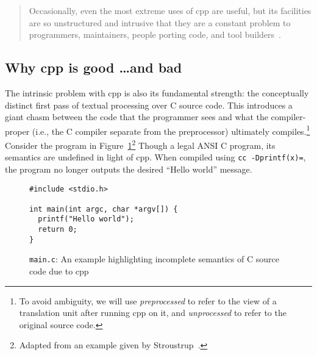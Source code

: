 \documentclass{article}
\newcommand{\Cpp}{\mbox{\textsf{cpp}}}
\newcommand{\C}{\mbox{\textsf{C}}}
\newcommand{\ie}{i.e.,}
\newcommand{\figref}[1]{Figure~\ref{#1}}
\begin{document}
\begin{quotation}
Occasionally, even the most extreme uses of \Cpp{} are useful, but its
facilities are so unstructured and intrusive that they are a constant
problem to programmers, maintainers, people porting code, and tool
builders~\cite[p.~424]{Stroustrup94}.
\end{quotation}

\subsection{Why \Cpp{} is good \ldots and bad}

The intrinsic problem with \Cpp{} is also its fundamental strength: the
conceptually distinct first pass of textual processing over \C{} source
code.  This introduces a giant chasm between the code that the
programmer sees and what the compiler-proper (\ie{} the \C{} compiler
separate from the preprocessor) ultimately compiles.\footnote{To avoid
  ambiguity, we will use \emph{preprocessed} to refer to the view of a
  translation unit after running \Cpp{} on it, and \emph{unprocessed} to
  refer to the original source code.} Consider the program in
\figref{fig:badmain}\footnote{Adapted from an example given by
  Stroustrup~\cite[p.~423]{Stroustrup94}.}  Though a legal ANSI \C{}
program, its semantics are undefined in light of \Cpp{}.  When compiled
using \texttt{cc -Dprintf(x)=}, the program no longer outputs the
desired ``Hello world'' message.

\begin{figure}[hbt]
\begin{center}
\begin{minipage}[t]{4.5in}
\label{fig:badmain}
\begin{verbatim}
#include <stdio.h>

int main(int argc, char *argv[]) {
  printf("Hello world");
  return 0;
}
\end{verbatim}
\caption{\texttt{main.c}: An example highlighting incomplete semantics of
  \C{} source code due to \Cpp{}}
\end{minipage}
\end{center}
\end{figure}
\end{document}
